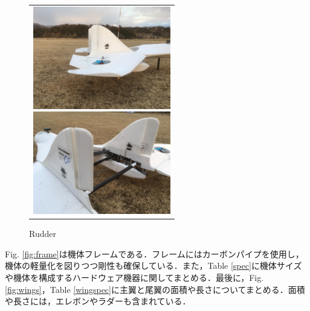 \begin{figure}[hb]
	\begin{center}
		\begin{tabular}{b}

			\begin{minipage}{0.49\hsize}
				\begin{center}
					\includegraphics[clip,width=6.0cm,bb=0 0 1067 800]{./z_figure_files/chapter2/7_elevon.jpg}
					\caption{Elevon}
					\label{fig:elevon}
				\end{center}
			\end{minipage}

			\begin{minipage}{0.49\hsize}
				\begin{center}
					\includegraphics[clip,width=6.0cm,bb=0 0 1067 800]{./z_figure_files/chapter2/8_rudder.jpg}
					\caption{Rudder}
					\label{fig:rudder}
				\end{center}
			\end{minipage}

		\end{tabular}
	\end{center}
\end{figure}

Fig. \ref{fig:frame}は機体フレームである．フレームにはカーボンパイプを使用し，機体の軽量化を図りつつ剛性も確保している．また，Table \ref{spec}に機体サイズや機体を構成するハードウェア機器に関してまとめる．最後に，Fig. \ref{fig:wings}，Table \ref{wingspec}に主翼と尾翼の面積や長さについてまとめる．面積や長さには，エレボンやラダーも含まれている．

